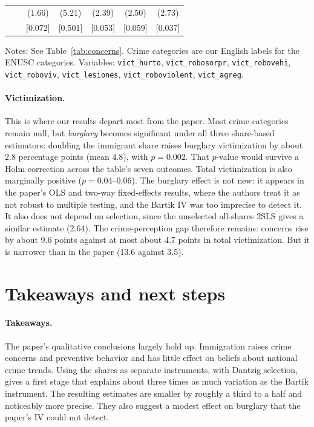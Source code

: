 \documentclass[11pt]{article}
\begin{document}
\begin{table}[htbp]
\begin{threeparttable}
\begin{tabular}{lcccccc}
 & & (1.66) & (5.21) & (2.39) & (2.50) & (2.73) \\
 & & [0.072] & [0.501] & [0.053] & [0.059] & [0.037] \\
\bottomrule
\end{tabular}
\begin{tablenotes}[flushleft]
\footnotesize
\item Notes: See Table~\ref{tab:concerns}. Crime categories are our English labels for the
ENUSC categories. Variables: \texttt{vict\_hurto}, \texttt{vict\_robosorpr},
\texttt{vict\_robovehi}, \texttt{vict\_roboviv}, \texttt{vict\_lesiones},
\texttt{vict\_roboviolent}, \texttt{vict\_agreg}.
\end{tablenotes}
\end{threeparttable}
\end{table}

\paragraph{Victimization.} This is where our results depart most from the paper. Most
crime categories remain null, but \emph{burglary} becomes significant under all three
share-based estimators: doubling the immigrant share raises burglary victimization by about
2.8 percentage points (mean 4.8), with $p = 0.002$. That $p$-value would survive a Holm
correction across the table's seven outcomes. Total victimization is also marginally
positive ($p = 0.04$--$0.06$). The burglary effect is not new: it appears in the paper's
OLS and two-way fixed-effects results, where the authors treat it as not robust to
multiple testing, and the Bartik IV was too imprecise to detect it. It also does not depend
on selection, since the unselected all-shares 2SLS gives a similar estimate (2.64). The
crime-perception gap therefore remains: concerns rise by about 9.6 points against at most
about 4.7 points in total victimization. But it is narrower than in the paper (13.6 against
3.5).

\section{Takeaways and next steps}

\paragraph{Takeaways.} The paper's qualitative conclusions largely hold up. Immigration
raises crime concerns and preventive behavior and has little effect on beliefs about
national crime trends. Using the shares as separate instruments, with Dantzig selection,
gives a first stage that explains about three times as much variation as the Bartik
instrument. The resulting estimates are smaller by roughly a third to a half and
noticeably more precise. They also suggest a modest effect on burglary that the paper's IV
could not detect.
\end{document}
